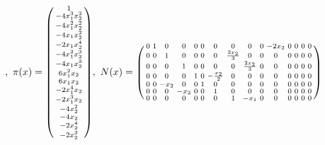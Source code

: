 \documentclass[fleqn]{article}
\begin{document}
\begin{equation}
,~
\pi(x) = \spmqty{
    1                \\
    -4x_{1}^3x_{2}^2 \\
    -4x_{1}^2x_{2}^2 \\
    -4x_{1}x_{2}^2   \\
    -2x_{1}x_{2}^4   \\
    -4x_{1}^2x_{2}^3 \\
    -4x_{1}x_{2}^3   \\
    6x_{1}^2x_{2}    \\
    6x_{1}x_{2}      \\
    -2x_{1}^4x_{2}   \\
    -2x_{1}^3x_{2}   \\
    -4x_{2}^2        \\
    -4x_{2}          \\
    -2x_{2}^4        \\
    -2x_{2}^3        \\
},~
N(x) = \spmqty{
    0      & 1      & 0      & 0                & 0     & 0                & 0                & 0                & 0                & 0       & -2x_{2} & 0                & 0                & 0     & 0      \\
    0      & 0      & 1      & 0                & 0     & 0                & 0                & \frac{2x_{2}}{3} & 0                & 0       & 0       & 0                & 0                & 0     & 0      \\
    0      & 0      & 0      & 1                & 0     & 0                & 0                & 0                & \frac{2x_{2}}{3} & 0       & 0       & 0                & 0                & 0     & 0      \\
    0      & 0      & 0      & 0                & 1     & 0                & -\frac{x_{2}}{2} & 0                & 0                & 0       & 0       & 0                & 0                & 0     & 0      \\
    0      & 0      & -x_{2} & 0                & 0     & 1                & 0                & 0                & 0                & 0       & 0       & 0                & 0                & 0     & 0      \\
    0      & 0      & 0      & -x_{2}           & 0     & 0                & 1                & 0                & 0                & 0       & 0       & 0                & 0                & 0     & 0      \\
    0      & 0      & 0      & 0                & 0     & 0                & 0                & 1                & -x_{1}           & 0       & 0       & 0                & 0                & 0     & 0      \\
}
\end{equation}
\end{document}
